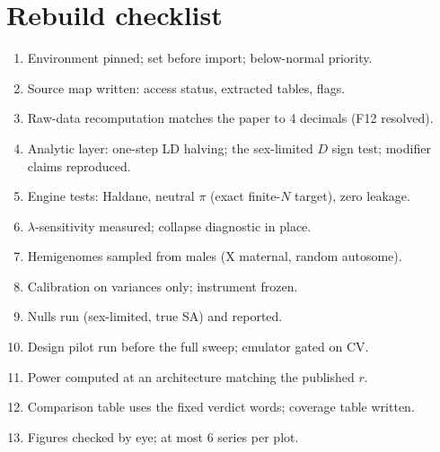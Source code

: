 \chapter{Rebuild checklist}
\begin{enumerate}
\item[$\square$] Environment pinned;  set before import; below-normal priority.
\item[$\square$] Source map written: access status, extracted tables, flags.
\item[$\square$] Raw-data recomputation matches the paper to 4 decimals (F12 resolved).
\item[$\square$] Analytic layer: one-step LD halving; the sex-limited $D$ sign test; modifier claims reproduced.
\item[$\square$] Engine tests: Haldane, neutral $\pi$ (exact finite-$N$ target), zero leakage.
\item[$\square$] $\lambda$-sensitivity measured; collapse diagnostic in place.
\item[$\square$] Hemigenomes sampled from males (X maternal, random autosome).
\item[$\square$] Calibration on variances only; instrument frozen.
\item[$\square$] Nulls run (sex-limited, true SA) and reported.
\item[$\square$] Design pilot run before the full sweep; emulator gated on CV.
\item[$\square$] Power computed at an architecture matching the published $r$.
\item[$\square$] Comparison table uses the fixed verdict words; coverage table written.
\item[$\square$] Figures checked by eye; at most 6 series per plot.
\end{enumerate}

